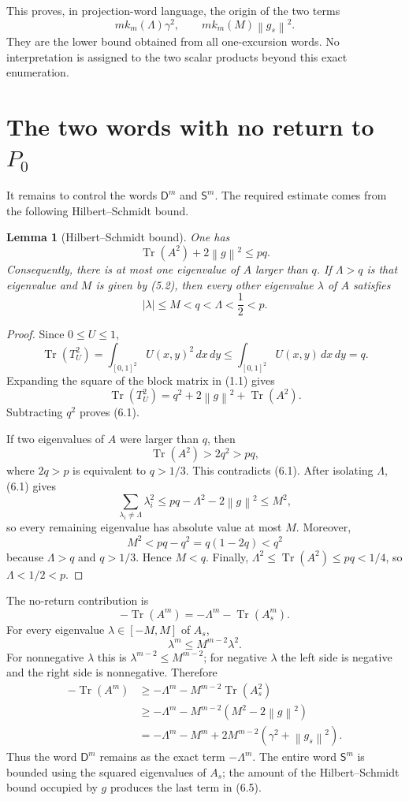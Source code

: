 \documentclass[11pt]{article}
\newtheorem{lemma}[proposition]{Lemma}
\newcommand{\D}{\mathsf D}
\newcommand{\Ssafe}{\mathsf S}
\newcommand{\Tr}{\operatorname{Tr}}
\newcommand{\norm}[1]{\left\lVert #1\right\rVert}
\begin{document}
This proves, in projection-word language, the origin of the two terms
\[
  m k_m(\Lambda)\gamma^2,
  \qquad
  m k_m(M)\norm{g_s}^2.
\]
They are the lower bound obtained from all one-excursion words.  No
interpretation is assigned to the two scalar products beyond this exact
enumeration.

\section{The two words with no return to $P_0$}

It remains to control the words $\D^m$ and $\Ssafe^m$.  The required estimate
comes from the following Hilbert--Schmidt bound.

\begin{lemma}[Hilbert--Schmidt bound]
One has
\[
  \Tr(A^2)+2\norm{g}^2\leq pq.
  \tag{6.1}
\]
Consequently, there is at most one eigenvalue of $A$ larger than $q$.  If
$\Lambda>q$ is that eigenvalue and $M$ is given by (5.2), then every other
eigenvalue $\lambda$ of $A$ satisfies
\[
  |\lambda|\leq M<q<\Lambda<\frac12<p.
  \tag{6.2}
\]
\end{lemma}

\begin{proof}
Since $0\leq U\leq1$,
\[
  \Tr(T_U^2)=\int_{[0,1]^2}U(x,y)^2\,dx\,dy
  \leq\int_{[0,1]^2}U(x,y)\,dx\,dy=q.
\]
Expanding the square of the block matrix in (1.1) gives
\[
  \Tr(T_U^2)=q^2+2\norm{g}^2+\Tr(A^2).
\]
Subtracting $q^2$ proves (6.1).

If two eigenvalues of $A$ were larger than $q$, then
\[
  \Tr(A^2)>2q^2>pq,
\]
where $2q>p$ is equivalent to $q>1/3$.  This contradicts (6.1).  After
isolating $\Lambda$, (6.1) gives
\[
  \sum_{\lambda_i\neq\Lambda}\lambda_i^2
  \leq pq-\Lambda^2-2\norm{g}^2
  \leq M^2,
\]
so every remaining eigenvalue has absolute value at most $M$.  Moreover,
\[
  M^2<pq-q^2=q(1-2q)<q^2
\]
because $\Lambda>q$ and $q>1/3$.  Hence $M<q$.  Finally,
$\Lambda^2\leq\Tr(A^2)\leq pq<1/4$, so $\Lambda<1/2<p$.
\end{proof}

The no-return contribution is
\[
  -\Tr(A^m)=-\Lambda^m-\Tr(A_s^m).
  \tag{6.3}
\]
For every eigenvalue $\lambda\in[-M,M]$ of $A_s$,
\[
  \lambda^m\leq M^{m-2}\lambda^2.
  \tag{6.4}
\]
For nonnegative $\lambda$ this is $\lambda^{m-2}\leq M^{m-2}$; for negative
$\lambda$ the left side is negative and the right side is nonnegative.
Therefore
\begin{equation}
\begin{aligned}
  -\Tr(A^m)
  &\geq-\Lambda^m-M^{m-2}\Tr(A_s^2)\\
  &\geq-\Lambda^m-M^{m-2}
    \left(M^2-2\norm{g}^2\right)\\
  &=-\Lambda^m-M^m
    +2M^{m-2}\left(\gamma^2+\norm{g_s}^2\right).
\end{aligned}
  \tag{6.5}
\end{equation}
Thus the word $\D^m$ remains as the exact term $-\Lambda^m$.  The entire
word $\Ssafe^m$ is bounded using the squared eigenvalues of $A_s$; the amount
of the Hilbert--Schmidt bound occupied by $g$ produces the last term in
(6.5).
\end{document}
